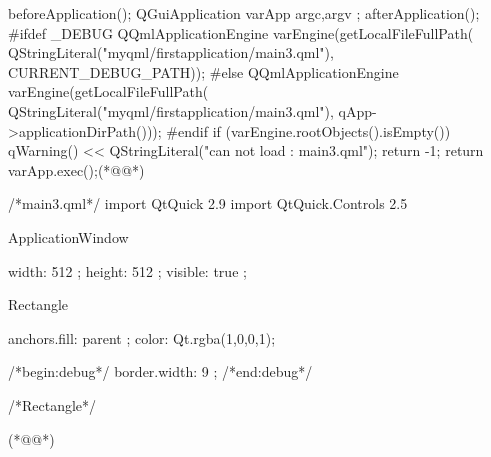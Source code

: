\label{f000022}    %
\FloatBarrier                                  %
\begin{thebookfilesourceone}[escapeinside={(*@}{@*)},
caption=GoodLuck,
title=\filesourcenumbernameone \thefilesourcenumber
,firstnumber=111]
beforeApplication();
QGuiApplication varApp{ argc,argv };
afterApplication();
#ifdef _DEBUG
QQmlApplicationEngine varEngine(getLocalFileFullPath(
    QStringLiteral("myqml/firstapplication/main3.qml"),
    CURRENT_DEBUG_PATH));
#else
QQmlApplicationEngine varEngine(getLocalFileFullPath(
    QStringLiteral("myqml/firstapplication/main3.qml"),
    qApp->applicationDirPath()));
#endif
if (varEngine.rootObjects().isEmpty()) {
    qWarning() << QStringLiteral("can not load : main3.qml");
    return -1;
}
return varApp.exec();(*@\marginpar[\hfill\setlength\fboxsep{2pt}\fbox{\footnotesize{\kaishu\parbox{1em}{\setlength{\baselineskip}{2pt}\filesourcenumbernameone}}\footnotesize{\thefilesourcenumber}}]{\setlength\fboxsep{2pt}\fbox{\footnotesize{\kaishu\parbox{1em}{\setlength{\baselineskip}{2pt}\filesourcenumbernameone}}\footnotesize{\thefilesourcenumber}}}@*)\end{thebookfilesourceone}          %
\addtocounter{lstlisting}{-1}   %
\label{f000025}    %
\FloatBarrier                                  %
\begin{thebookfilesourceone}[escapeinside={(*@}{@*)},
caption=GoodLuck,
title=\filesourcenumbernameone \thefilesourcenumber
]
/*main3.qml*/
import QtQuick 2.9
import QtQuick.Controls 2.5

ApplicationWindow {

    width: 512 ;
    height: 512 ;
    visible: true ;

    Rectangle{
        anchors.fill: parent ;
        color: Qt.rgba(1,0,0,1);

        /*begin:debug*/
        border.width: 9 ;
        /*end:debug*/

    }/*Rectangle*/

}(*@\marginpar[\hfill\setlength\fboxsep{2pt}\fbox{\footnotesize{\kaishu\parbox{1em}{\setlength{\baselineskip}{2pt}\filesourcenumbernameone}}\footnotesize{\thefilesourcenumber}}]{\setlength\fboxsep{2pt}\fbox{\footnotesize{\kaishu\parbox{1em}{\setlength{\baselineskip}{2pt}\filesourcenumbernameone}}\footnotesize{\thefilesourcenumber}}}@*)\end{thebookfilesourceone}          %
